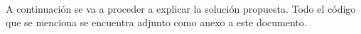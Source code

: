 \documentclass[../../memoria.tex]{subfiles}
\begin{document}
\paragraph{}
A continuación se va a proceder a explicar la solución propuesta. Todo el código que se menciona se encuentra adjunto como anexo a este documento.
\end{document}
